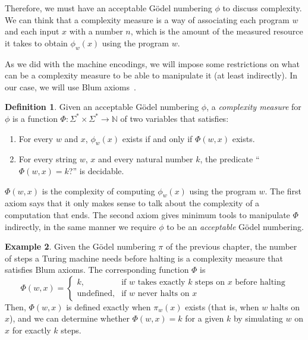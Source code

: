 \documentclass[12pt]{article}
\theoremstyle{definition}
\newtheorem{definition}{Definition}
\newtheorem{example}[definition]{Example}
\begin{document}
Therefore,
we must have an acceptable Gödel numbering $\phi$
to discuss complexity.
We can think that a complexity measure is a way of associating
each program $w$ and each input $x$
with a number $n$,
which is the amount of the measured resource it takes to obtain $\phi_w(x)$
using the program $w$.

As we did with the machine encodings,
we will impose some restrictions on what can be a complexity measure
to be able to manipulate it (at least indirectly).
In our case,
we will use Blum axioms~\cite[p.~324]{Blum1967}.

\begin{definition}
    Given an acceptable Gödel numbering $\phi$,
    a \emph{complexity measure} for $\phi$
    is a function $\Phi:\Sigma^* \times \Sigma^* \to \mathbb N$ of two variables
    that satisfies: \cite[p.~324]{Blum1967}
    \begin{enumerate}
        \item For every $w$ and $x$,
            $\phi_w(x)$ exists if and only if $\Phi(w, x)$ exists.
        \item For every string $w$, $x$ and every natural number $k$,
            the predicate ``$\Phi(w, x) = k$?'' is decidable.
    \end{enumerate}
\end{definition}

$\Phi(w, x)$ is the complexity of computing $\phi_w(x)$
using the program $w$.
The first axiom says that it only makes sense
to talk about the complexity of a computation that ends.
The second axiom gives minimum tools to manipulate $\Phi$ indirectly,
in the same manner we require $\phi$ to be an \emph{acceptable} Gödel numbering.

\begin{example}
    Given the Gödel numbering $\pi$ of the previous chapter,
    the number of steps a Turing machine needs before halting
    is a complexity measure that satisfies Blum axioms.
    The corresponding function $\Phi$ is
    \begin{equation*}
        \Phi(w, x) = \begin{cases}
            k, &\text{if $w$ takes exactly $k$ steps on $x$ before halting} \\
            \text{undefined}, &\text{if $w$ never halts on $x$}
        \end{cases}
    \end{equation*}
    Then, $\Phi(w, x)$ is defined exactly when $\pi_w(x)$ exists
    (that is, when $w$ halts on $x$),
    and we can determine whether $\Phi(w, x) = k$ for a given $k$
    by simulating $w$ on $x$ for exactly $k$ steps.
\end{example}
\end{document}
